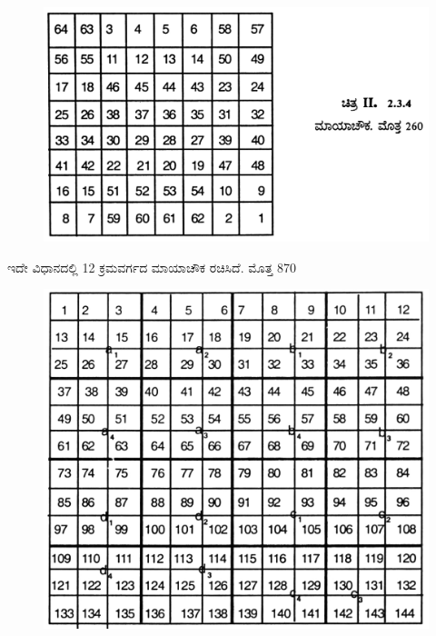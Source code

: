 \begin{figure}[h]
\includegraphics{src/figures/chap3/fig3.27.jpg}
\end{figure}
ಇದೇ ವಿಧಾನದಲ್ಲಿ 12 ಕ್ರಮವರ್ಗದ ಮಾಯಾಚೌಕ ರಚಿಸಿದೆ. ಮೊತ್ತ 870
\begin{figure}[h]
\includegraphics{src/figures/chap3/fig3.28.jpg}
\end{figure}

